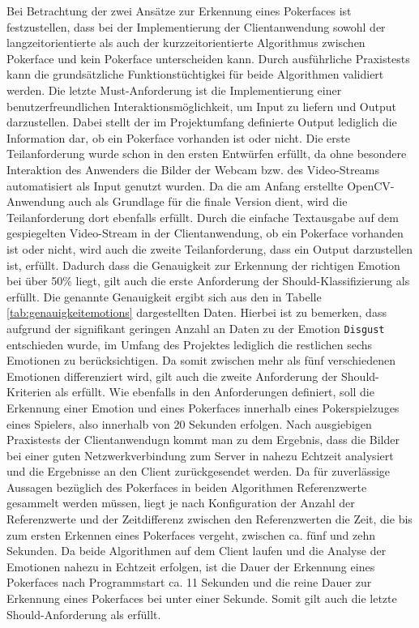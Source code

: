 \documentclass[12pt, a4paper]{report}
\begin{document}
Bei Betrachtung der zwei Ansätze zur Erkennung eines Pokerfaces ist festzustellen, dass bei der Implementierung der Clientanwendung sowohl der langzeitorientierte als auch der kurzzeitorientierte Algorithmus zwischen Pokerface und kein Pokerface unterscheiden kann. Durch ausführliche Praxistests kann die grundsätzliche Funktionstüchtigkei für beide Algorithmen validiert werden. Die letzte Must-Anforderung ist die Implementierung einer benutzerfreundlichen Interaktionsmöglichkeit, um Input zu liefern und Output darzustellen. Dabei stellt der im Projektumfang definierte Output lediglich die Information dar, ob ein Pokerface vorhanden ist oder nicht. Die erste Teilanforderung wurde schon in den ersten Entwürfen erfüllt, da ohne besondere Interaktion des Anwenders die Bilder der Webcam bzw. des Video-Streams automatisiert als Input genutzt wurden. Da die am Anfang erstellte OpenCV-Anwendung auch als Grundlage für die finale Version dient, wird die Teilanforderung dort ebenfalls erfüllt. Durch die einfache Textausgabe auf dem gespiegelten Video-Stream in der Clientanwendung, ob ein Pokerface vorhanden ist oder nicht, wird auch die zweite Teilanforderung, dass ein Output darzustellen ist, erfüllt.\newline
Dadurch dass die Genauigkeit zur Erkennung der richtigen Emotion bei über 50\% liegt, gilt auch die erste Anforderung der Should-Klassifizierung als erfüllt. Die genannte Genauigkeit ergibt sich aus den in Tabelle \ref{tab:genauigkeitemotions} dargestellten Daten. Hierbei ist zu bemerken, dass aufgrund der signifikant geringen Anzahl an Daten zu der Emotion \texttt{Disgust} entschieden wurde, im Umfang des Projektes lediglich die restlichen sechs Emotionen zu berücksichtigen. Da somit zwischen mehr als fünf verschiedenen Emotionen differenziert wird, gilt auch die zweite Anforderung der Should-Kriterien als erfüllt. Wie ebenfalls in den Anforderungen definiert, soll die Erkennung einer Emotion und eines Pokerfaces innerhalb eines Pokerspielzuges eines Spielers, also innerhalb von 20 Sekunden erfolgen. Nach ausgiebigen Praxistests der Clientanwendugn kommt man zu dem Ergebnis, dass die Bilder bei einer guten Netzwerkverbindung zum Server in nahezu Echtzeit analysiert und die Ergebnisse an den Client zurückgesendet werden. Da für zuverlässige Aussagen bezüglich des Pokerfaces in beiden Algorithmen Referenzwerte gesammelt werden müssen, liegt je nach Konfiguration der Anzahl der Referenzwerte und der Zeitdifferenz zwischen den Referenzwerten die Zeit, die bis zum ersten Erkennen eines Pokerfaces vergeht, zwischen ca. fünf und zehn Sekunden. Da beide Algorithmen auf dem Client laufen und die Analyse der Emotionen nahezu in Echtzeit erfolgen, ist die Dauer der Erkennung eines Pokerfaces nach Programmstart ca. 11 Sekunden und die reine Dauer zur Erkennung eines Pokerfaces bei unter einer Sekunde. Somit gilt auch die letzte Should-Anforderung als erfüllt.\newline
\end{document}
